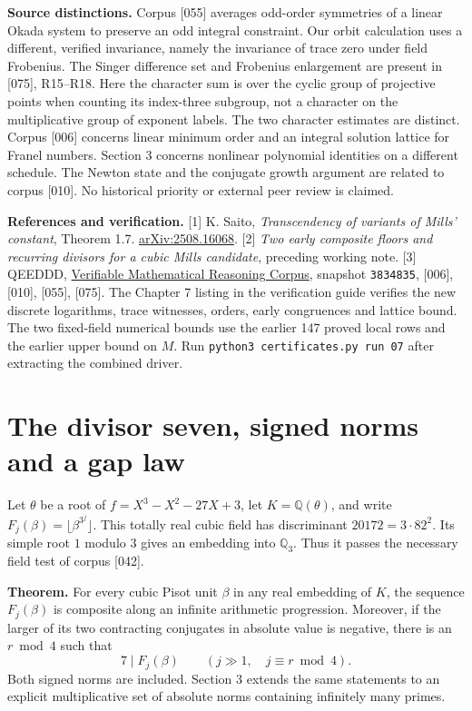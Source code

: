 \documentclass[11pt,a4paper,oneside,openany]{book}
\newcommand{\Q}{\mathbb Q}\newcommand{\C}{\mathbb C}\newcommand{\Z}{\mathbb Z}\newcommand{\F}{\mathbb F}\newcommand{\Tr}{\operatorname{Tr}}\newcommand{\Nm}{\operatorname{N}}\newcommand{\ord}{\operatorname{ord}}\newcommand{\K}{K}\newcommand{\OO}{\mathcal O_K}\newcommand{\unit}{\mathcal U}
\begin{document}
\textbf{Source distinctions.} Corpus [055] averages odd-order symmetries of a linear Okada system to preserve an odd integral constraint. Our orbit calculation uses a different, verified invariance, namely the invariance of trace zero under field Frobenius. The Singer difference set and Frobenius enlargement are present in [075], R15--R18. Here the character sum is over the cyclic group of projective points when counting its index-three subgroup, not a character on the multiplicative group of exponent labels. The two character estimates are distinct. Corpus [006] concerns linear minimum order and an integral solution lattice for Franel numbers. Section 3 concerns nonlinear polynomial identities on a different schedule. The Newton state and the conjugate growth argument are related to corpus [010]. No historical priority or external peer review is claimed.

\textbf{References and verification.} [1] K. Saito, \emph{Transcendency of variants of Mills' constant}, Theorem 1.7. \href{https://arxiv.org/abs/2508.16068}{arXiv:2508.16068}.
[2] \emph{Two early composite floors and recurring divisors for a cubic Mills candidate}, preceding working note. [3] QEEDDD, \href{https://github.com/QEEDDD/Verifiable-Mathematical-Reasoning-Corpus}{Verifiable Mathematical Reasoning Corpus}, snapshot \texttt{3834835}, [006], [010], [055], [075].
The Chapter 7 listing in the verification guide verifies the new discrete logarithms, trace witnesses, orders, early congruences and lattice bound. The two fixed-field numerical bounds use the earlier 147 proved local rows and the earlier upper bound on $M$. Run \texttt{python3 certificates.py run 07} after extracting the combined driver.


\chapter{The divisor seven, signed norms and a gap law}\label{ch:seven}
Let $\theta$ be a root of $f=X^3-X^2-27X+3$, let $K=\Q(\theta)$, and write $F_j(\beta)=\lfloor\beta^{3^j}\rfloor$. This totally real cubic field has discriminant $20172=3\cdot82^2$. Its simple root $1$ modulo $3$ gives an embedding into $\Q_3$. Thus it passes the necessary field test of corpus [042].

\textbf{Theorem.} For every cubic Pisot unit $\beta$ in any real embedding of $K$, the sequence $F_j(\beta)$ is composite along an infinite arithmetic progression. Moreover, if the larger of its two contracting conjugates in absolute value is negative, there is an $r\bmod4$ such that
\[
                     7\mid F_j(\beta)\qquad (j\gg1,\quad j\equiv r\bmod4).
\]
Both signed norms are included. Section 3 extends the same statements to an explicit multiplicative set of absolute norms containing infinitely many primes.
\end{document}
